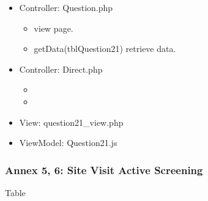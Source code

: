 \documentclass[letterpaper,10pt,english,openany,oneside]{sphinxmanual}
\begin{document}
\begin{sphinxVerbatim}[commandchars=\\\{\}]
               
  
               
\end{sphinxVerbatim}
\begin{itemize}
\item {} 
\sphinxAtStartPar
Controller: Question.php
\begin{itemize}
\item {} 
\sphinxAtStartPar
{} view page.

\item {} 
\sphinxAtStartPar
getData(tblQuestion21) retrieve data.

\end{itemize}

\item {} 
\sphinxAtStartPar
Controller: Direct.php
\begin{itemize}
\item {} 
\sphinxAtStartPar
{}

\item {} 
\sphinxAtStartPar
{}

\end{itemize}

\item {} 
\sphinxAtStartPar
View: question21\_view.php

\item {} 
\sphinxAtStartPar
ViewModel: Question21.js

\end{itemize}


\subsubsection{Annex 5, 6: Site Visit Active Screening}
\label{\detokenize{module/module:annex-5-6-site-visit-active-screening}}
\sphinxAtStartPar
Table
\end{document}
